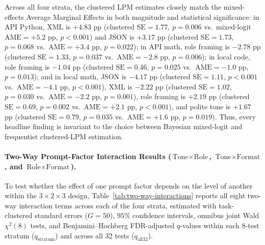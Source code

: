 \documentclass[a4paper,fleqn]{cas-sc}
\begin{document}
Across all four strata, the clustered LPM estimates closely match the mixed-effects Average Marginal Effects in both magnitude and statistical significance: in API Python, XML is $+4.83$ pp (clustered $\text{SE} = 1.77$, $p = 0.006$ vs.\ mixed-logit $\text{AME} = +5.2$ pp, $p < 0.001$) and JSON is $+3.17$ pp (clustered $\text{SE} = 1.73$, $p = 0.068$ vs.\ $\text{AME} = +3.4$ pp, $p = 0.022$); in API math, role framing is $-2.78$ pp (clustered $\text{SE} = 1.33$, $p = 0.037$ vs.\ $\text{AME} = -2.8$ pp, $p = 0.006$); in local code, role framing is $-1.04$ pp (clustered $\text{SE} = 0.46$, $p = 0.025$ vs.\ $\text{AME} = -1.0$ pp, $p = 0.013$); and in local math, JSON is $-4.17$ pp (clustered $\text{SE} = 1.11$, $p < 0.001$ vs.\ $\text{AME} = -4.1$ pp, $p < 0.001$), XML is $-2.22$ pp (clustered $\text{SE} = 1.02$, $p = 0.030$ vs.\ $\text{AME} = -2.2$ pp, $p = 0.001$), role framing is $+2.19$ pp (clustered $\text{SE} = 0.69$, $p = 0.002$ vs.\ $\text{AME} = +2.1$ pp, $p < 0.001$), and polite tone is $+1.67$ pp (clustered $\text{SE} = 0.79$, $p = 0.035$ vs.\ $\text{AME} = +1.6$ pp, $p = 0.019$). Thus, every headline finding is invariant to the choice between Bayesian mixed-logit and frequentist clustered-LPM estimation.

\paragraph{Two-Way Prompt-Factor Interaction Results ($\text{Tone} \times \text{Role}$, $\text{Tone} \times \text{Format}$, and $\text{Role} \times \text{Format}$).}
To test whether the effect of one prompt factor depends on the level of another within the $3 \times 2 \times 3$ design, Table~\ref{tab:two-way-interactions} reports all eight two-way interaction terms across each of the four strata, estimated with task-clustered standard errors ($G = 50$), $95\%$ confidence intervals, omnibus joint Wald $\chi^2(8)$ tests, and Benjamini--Hochberg FDR-adjusted $q$-values within each 8-test stratum ($q_{\text{stratum}}$) and across all 32 tests ($q_{\text{all32}}$).
\end{document}
